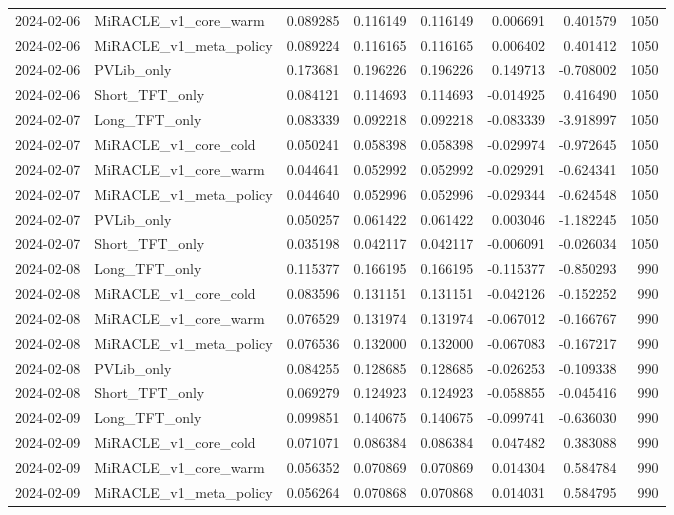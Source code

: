 \begin{tabular}{llrrrrrr}
2024-02-06 & MiRACLE_v1_core_warm & 0.089285 & 0.116149 & 0.116149 & 0.006691 & 0.401579 & 1050 \\
2024-02-06 & MiRACLE_v1_meta_policy & 0.089224 & 0.116165 & 0.116165 & 0.006402 & 0.401412 & 1050 \\
2024-02-06 & PVLib_only & 0.173681 & 0.196226 & 0.196226 & 0.149713 & -0.708002 & 1050 \\
2024-02-06 & Short_TFT_only & 0.084121 & 0.114693 & 0.114693 & -0.014925 & 0.416490 & 1050 \\
2024-02-07 & Long_TFT_only & 0.083339 & 0.092218 & 0.092218 & -0.083339 & -3.918997 & 1050 \\
2024-02-07 & MiRACLE_v1_core_cold & 0.050241 & 0.058398 & 0.058398 & -0.029974 & -0.972645 & 1050 \\
2024-02-07 & MiRACLE_v1_core_warm & 0.044641 & 0.052992 & 0.052992 & -0.029291 & -0.624341 & 1050 \\
2024-02-07 & MiRACLE_v1_meta_policy & 0.044640 & 0.052996 & 0.052996 & -0.029344 & -0.624548 & 1050 \\
2024-02-07 & PVLib_only & 0.050257 & 0.061422 & 0.061422 & 0.003046 & -1.182245 & 1050 \\
2024-02-07 & Short_TFT_only & 0.035198 & 0.042117 & 0.042117 & -0.006091 & -0.026034 & 1050 \\
2024-02-08 & Long_TFT_only & 0.115377 & 0.166195 & 0.166195 & -0.115377 & -0.850293 & 990 \\
2024-02-08 & MiRACLE_v1_core_cold & 0.083596 & 0.131151 & 0.131151 & -0.042126 & -0.152252 & 990 \\
2024-02-08 & MiRACLE_v1_core_warm & 0.076529 & 0.131974 & 0.131974 & -0.067012 & -0.166767 & 990 \\
2024-02-08 & MiRACLE_v1_meta_policy & 0.076536 & 0.132000 & 0.132000 & -0.067083 & -0.167217 & 990 \\
2024-02-08 & PVLib_only & 0.084255 & 0.128685 & 0.128685 & -0.026253 & -0.109338 & 990 \\
2024-02-08 & Short_TFT_only & 0.069279 & 0.124923 & 0.124923 & -0.058855 & -0.045416 & 990 \\
2024-02-09 & Long_TFT_only & 0.099851 & 0.140675 & 0.140675 & -0.099741 & -0.636030 & 990 \\
2024-02-09 & MiRACLE_v1_core_cold & 0.071071 & 0.086384 & 0.086384 & 0.047482 & 0.383088 & 990 \\
2024-02-09 & MiRACLE_v1_core_warm & 0.056352 & 0.070869 & 0.070869 & 0.014304 & 0.584784 & 990 \\
2024-02-09 & MiRACLE_v1_meta_policy & 0.056264 & 0.070868 & 0.070868 & 0.014031 & 0.584795 & 990 \\

\end{tabular}

